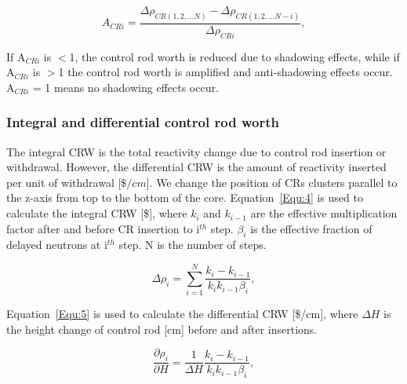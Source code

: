 \begin{equation}
\label{Equ:3}
{{A}_{CRi}}=\dfrac{{{\Delta}{\rho}_{CR(1,2,\ldots N)}}-{{\Delta}{\rho}_{CR(1,2,\ldots N-i)}}}{{\Delta}{\rho}_{CRi}},
\end{equation}

If A$_{CRi}$ is $<$1, the control rod worth is reduced due to shadowing effects, while if A$_{CRi}$ is $>$1 the control rod worth is amplified and anti-shadowing effects occur. A$_{CRi}$ = 1 means no shadowing effects occur.

\subsubsection{Integral and differential control rod worth}

The integral CRW is the total reactivity change due to control rod insertion or withdrawal. However, the differential CRW is the amount of reactivity inserted per unit of withdrawal [$\$/cm$]. We change the position of CRs clusters parallel to the z-axis from top to the bottom of the core. Equation~\ref{Equ:4} is used to calculate the integral CRW [\$], where $k_{i}$ and $k_{i-1}$ are the effective multiplication factor after and before CR insertion to i$^{th}$ step. $\beta_{i}$ is the effective fraction of delayed neutrons at i$^{th}$ step. N is the number of steps.

\begin{equation}
\label{Equ:4}
{{\Delta}{\rho}_{i}}=\sum_{i=1}^{N}\dfrac{{k_{i}}-{k_{i-1}}}{{{k_{i}}{k_{i-1}}}{{\beta}_{i}}},
\end{equation}

Equation~\ref{Equ:5} is used to calculate the differential CRW [\$/cm], where $\Delta H$ is the height change of control rod [cm] before and after insertions.

\begin{equation}
\label{Equ:5}
\dfrac{{\partial}{\rho}_{i}}{{\partial{H}}}=\dfrac{1}{{\Delta}{H}}\dfrac{{k_{i}}-{k_{i-1}}}{{{k_{i}}{k_{i-1}}}{{\beta}_{i}}},
\end{equation}


